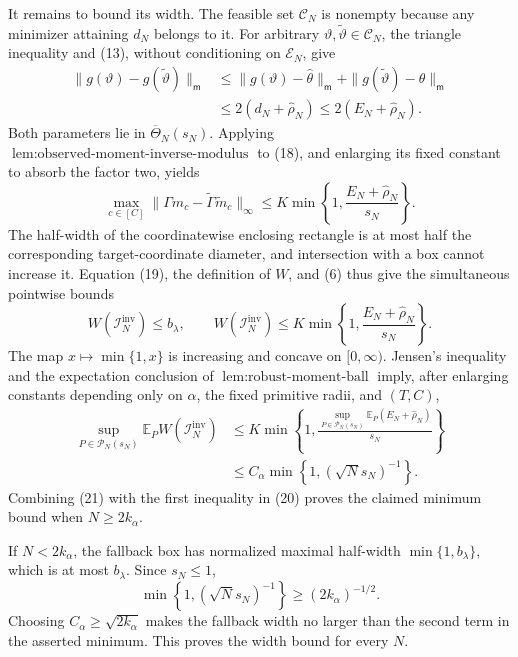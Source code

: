 It remains to bound its width.  The feasible set \(\mathcal C_N\) is nonempty because any minimizer attaining \(d_N\) belongs to it.  For arbitrary \(\vartheta,\widetilde\vartheta\in\mathcal C_N\), the triangle inequality and (13), without conditioning on \(\mathcal E_N\), give
\[
 \begin{aligned}
 \|g(\vartheta)-g(\widetilde\vartheta)\|_{\mathsf m}
 &\leq\|g(\vartheta)-\widehat\theta\|_{\mathsf m}
 +\|g(\widetilde\vartheta)-\widehat\theta\|_{\mathsf m}\\
 &\leq2(d_N+\widehat\rho_N)
 \leq2(E_N+\widehat\rho_N).
 \end{aligned}
 \tag{18}
\]
Both parameters lie in \(\overline\Theta_N(s_N)\).  Applying \(\operatorname{lem:observed\text{-}moment\text{-}inverse\text{-}modulus}\) to (18), and enlarging its fixed constant to absorb the factor two, yields
\[
 \max_{c\in[C]}
 \|\Gamma m_c-\widetilde\Gamma\widetilde m_c\|_\infty
 \leq K\min\!\left\{1,
 \frac{E_N+\widehat\rho_N}{s_N}\right\}.
 \tag{19}
\]
The half-width of the coordinatewise enclosing rectangle is at most half the corresponding target-coordinate diameter, and intersection with a box cannot increase it.  Equation (19), the definition of \(W\), and (6) thus give the simultaneous pointwise bounds
\[
 W(\mathcal I_N^{\mathrm{inv}})\leq b_\lambda,
 \qquad
 W(\mathcal I_N^{\mathrm{inv}})
 \leq K\min\!\left\{1,
 \frac{E_N+\widehat\rho_N}{s_N}\right\}.
 \tag{20}
\]
The map \(x\mapsto\min\{1,x\}\) is increasing and concave on \([0,\infty)\).  Jensen's inequality and the expectation conclusion of \(\operatorname{lem:robust\text{-}moment\text{-}ball}\) imply, after enlarging constants depending only on \(\alpha\), the fixed primitive radii, and \((T,C)\),
\[
 \begin{aligned}
 \sup_{P\in\mathcal P_N(s_N)}
 \mathbb E_P W(\mathcal I_N^{\mathrm{inv}})
 &\leq K\min\!\left\{1,
 \frac{\sup_{P\in\mathcal P_N(s_N)}
 \mathbb E_P(E_N+\widehat\rho_N)}{s_N}\right\}\\
 &\leq C_\alpha\min\!\left\{1,(\sqrt N s_N)^{-1}\right\}.
 \end{aligned}
 \tag{21}
\]
Combining (21) with the first inequality in (20) proves the claimed minimum bound when \(N\geq2k_\alpha\).

If \(N<2k_\alpha\), the fallback box has normalized maximal half-width \(\min\{1,b_\lambda\}\), which is at most \(b_\lambda\).  Since \(s_N\leq1\),
\[
 \min\!\left\{1,(\sqrt N s_N)^{-1}\right\}
 \geq(2k_\alpha)^{-1/2}.
 \tag{22}
\]
Choosing \(C_\alpha\geq\sqrt{2k_\alpha}\) makes the fallback width no larger than the second term in the asserted minimum.  This proves the width bound for every \(N\).

